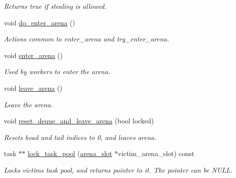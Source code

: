 \begin{DoxyCompactItemize}
\begin{DoxyCompactList}\small\item\em Returns true if stealing is allowed. \end{DoxyCompactList}\item 
\hypertarget{classtbb_1_1internal_1_1generic__scheduler_a6e93c1283fad6f681e6d0f0f50cf515a}{}void \hyperlink{classtbb_1_1internal_1_1generic__scheduler_a6e93c1283fad6f681e6d0f0f50cf515a}{do\+\_\+enter\+\_\+arena} ()\label{classtbb_1_1internal_1_1generic__scheduler_a6e93c1283fad6f681e6d0f0f50cf515a}

\begin{DoxyCompactList}\small\item\em Actions common to enter\+\_\+arena and try\+\_\+enter\+\_\+arena. \end{DoxyCompactList}\item 
void \hyperlink{classtbb_1_1internal_1_1generic__scheduler_a28b7abb0919184fb3a19b3e865a11dcc}{enter\+\_\+arena} ()
\begin{DoxyCompactList}\small\item\em Used by workers to enter the arena. \end{DoxyCompactList}\item 
void \hyperlink{classtbb_1_1internal_1_1generic__scheduler_a2e07b903e093bff04e8d9de4fdbab70f}{leave\+\_\+arena} ()
\begin{DoxyCompactList}\small\item\em Leave the arena. \end{DoxyCompactList}\item 
void \hyperlink{classtbb_1_1internal_1_1generic__scheduler_ae28f8ec4bb8dab580d3452d58a84ebbe}{reset\+\_\+deque\+\_\+and\+\_\+leave\+\_\+arena} (bool locked)
\begin{DoxyCompactList}\small\item\em Resets head and tail indices to 0, and leaves arena. \end{DoxyCompactList}\item 
task $\ast$$\ast$ \hyperlink{classtbb_1_1internal_1_1generic__scheduler_a28bc27fa6c9a0cea424ced83b9f020ac}{lock\+\_\+task\+\_\+pool} (\hyperlink{structtbb_1_1internal_1_1arena__slot}{arena\+\_\+slot} $\ast$victim\+\_\+arena\+\_\+slot) const 
\begin{DoxyCompactList}\small\item\em Locks victim\textquotesingle{}s task pool, and returns pointer to it. The pointer can be N\+U\+L\+L. \end{DoxyCompactList}\item 
$$
\end{DoxyCompactItemize}
